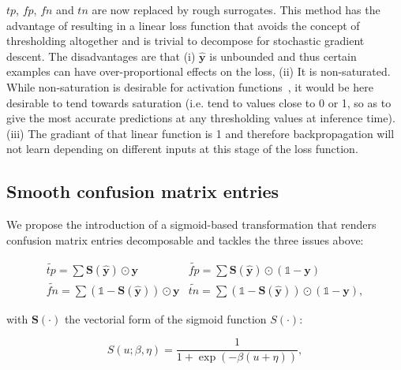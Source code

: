 
\(tp\), \(fp\), \(fn\) and \(tn\) are now replaced by rough surrogates. This method has the advantage of resulting in a linear loss function that avoids the concept of thresholding altogether and is trivial to decompose for stochastic gradient descent. The disadvantages are that (i) \(\hat{\mathbf{y}}\) is unbounded and thus certain examples can have over-proportional effects on the loss, (ii) It is non-saturated. While non-saturation is desirable for activation functions~\cite{saturation}, it would be here desirable to tend towards saturation (i.e. tend to values close to 0 or 1, so as to give the most accurate predictions at any thresholding values at inference time). (iii) The gradiant of that linear function is 1 and therefore backpropagation will not learn depending on different inputs at this stage of the loss function. 


\subsection{Smooth confusion matrix entries}

We propose the introduction of a sigmoid-based transformation that renders confusion matrix entries decomposable and tackles the three issues above:

\begin{equation}
\label{eq:smooth}
\begin{array}{ll} \widetilde{\mathit{tp}} = \sum \mathbf{S}(\hat{\mathbf{y}}) \odot \mathbf{y}  & \widetilde{\mathit{fp}} = \sum \mathbf{S}(\hat{\mathbf{y}}) \odot (\mathds{1} - \mathbf{y}) \\ \widetilde{\mathit{fn}} = \sum (\mathds{1} - \mathbf{S}(\hat{\mathbf{y}})) \odot \mathbf{y} & \widetilde{\mathit{tn}} = \sum (\mathds{1} - \mathbf{S}(\hat{\mathbf{y}})) \odot (\mathds{1} - \mathbf{y}),
\end{array}
\end{equation}

with $\mathbf{S}(\cdot)$ the vectorial form of the sigmoid function $S(\cdot)$:

\begin{equation}
S(u; \beta, \eta)=\frac{1}{1+\exp (-\beta (u + \eta))},
\end{equation}

